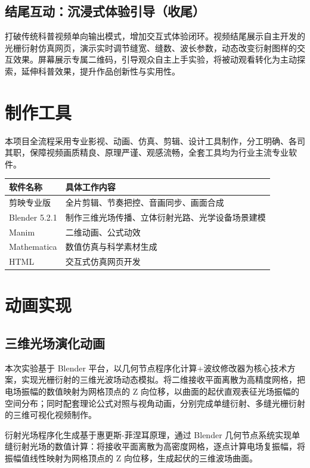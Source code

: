 \documentclass[12pt,a4paper]{ctexrep}
\begin{document}
\subsection{结尾互动：沉浸式体验引导（收尾）}

打破传统科普视频单向输出模式，增加交互式体验闭环。视频结尾展示自主开发的光栅衍射仿真网页，演示实时调节缝宽、缝数、波长参数，动态改变衍射图样的交互效果。屏幕展示专属二维码，引导观众自主上手实验，将被动观看转化为主动探索，延伸科普效果，提升作品创新性与实用性。

\section{制作工具}

本项目全流程采用专业影视、动画、仿真、剪辑、设计工具制作，分工明确、各司其职，保障视频画质精良、原理严谨、观感流畅，全套工具均为行业主流专业软件。

\begin{table}[htbp]
\centering
\begin{tabular}{ll}
\toprule
软件名称 & 具体工作内容 \\
\midrule
剪映专业版 & 全片剪辑、节奏把控、音画同步、画面合成 \\
Blender 5.2.1 & 制作三维光场传播、立体衍射光路、光学设备场景建模 \\
Manim & 二维动画、公式动效 \\
Mathematica & 数值仿真与科学素材生成 \\
HTML & 交互式仿真网页开发 \\
\bottomrule
\end{tabular}
\end{table}

\section{动画实现}

\subsection{三维光场演化动画}

本次实验基于 Blender 平台，以几何节点程序化计算+波纹修改器为核心技术方案，实现光栅衍射的三维光波场动态模拟。将二维接收平面离散为高精度网格，把电场振幅的数值映射为网格顶点的 Z 向位移，以曲面的起伏直观表征光场振幅的空间分布；同时配套理论公式对照与视角动画，分别完成单缝衍射、多缝光栅衍射的三维可视化视频制作。

衍射光场程序化生成基于惠更斯-菲涅耳原理，通过 Blender 几何节点系统实现单缝衍射光场的数值计算：将接收平面离散为高密度网格，逐点计算电场复振幅，将振幅值线性映射为网格顶点的 Z 向位移，生成起伏的三维波场曲面。
\end{document}
